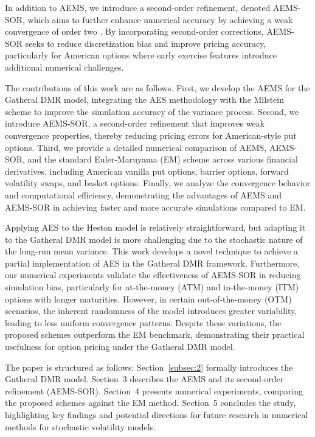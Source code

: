 \documentclass[graybox]{svmult}
\begin{document}
In addition to AEMS, we introduce a second-order refinement, denoted AEMS-SOR, which aims to further enhance numerical accuracy by achieving a weak convergence of order two \cite{glasserman2004monte}. By incorporating second-order corrections, AEMS-SOR seeks to reduce discretization bias and improve pricing accuracy, particularly for American options where early exercise features introduce additional numerical challenges.


The contributions of this work are as follows. First, we develop the AEMS for the Gatheral DMR model, integrating the AES methodology with the Milstein scheme to improve the simulation accuracy of the variance process. Second, we introduce AEMS-SOR, a second-order refinement that improves weak convergence properties, thereby reducing pricing errors for American-style put options. Third, we provide a detailed numerical comparison of AEMS, AEMS-SOR, and the standard Euler-Maruyama (EM) scheme across various financial derivatives, including American vanilla put options, barrier options, forward volatility swaps, and basket options. Finally, we analyze the convergence behavior and computational efficiency, demonstrating the advantages of AEMS and AEMS-SOR in achieving faster and more accurate simulations compared to EM.


Applying AES to the Heston model is relatively straightforward, but adapting it to the Gatheral DMR model is more challenging due to the stochastic nature of the long-run mean variance. This work develops a novel technique to achieve a partial implementation of AES in the Gatheral DMR framework. Furthermore, our numerical experiments validate the effectiveness of AEMS-SOR in reducing simulation bias, particularly for at-the-money (ATM) and in-the-money (ITM) options with longer maturities. However, in certain out-of-the-money (OTM) scenarios, the inherent randomness of the model introduces greater variability, leading to less uniform convergence patterns. Despite these variations, the proposed schemes outperform the EM benchmark, demonstrating their practical usefulness for option pricing under the Gatheral DMR model.

The paper is structured as follows: Section~\ref{subsec:2} formally introduces the Gatheral DMR model. Section~3 describes the AEMS and its second-order refinement (AEMS-SOR). Section~4 presents numerical experiments, comparing the proposed schemes against the EM method. Section~5 concludes the study, highlighting key findings and potential directions for future research in numerical methods for stochastic volatility models.
\end{document}
